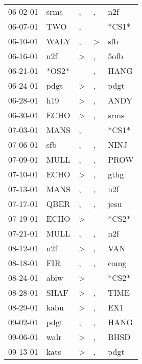 \begin{supertabular}{lllll}
 06-02-01 &   srms &                , &                , &    n2f \\
 06-07-01 &    TWO &                , &                  &  *CS1* \\
 06-10-01 &   WALY &                , &     \textgreater &    sfb \\
 06-16-01 &    n2f &     \textgreater &                , &   5ofb \\
 06-21-01 &  *OS2* &                  &                , &   HANG \\
 06-24-01 &   pdgt &     \textgreater &                , &   pdgt \\
 06-28-01 &    h19 &     \textgreater &                , &   ANDY \\
 06-30-01 &   ECHO &     \textgreater &                , &   srms \\
 07-03-01 &   MANS &                , &                  &  *CS1* \\
 07-06-01 &    sfb &                , &                , &   NINJ \\
 07-09-01 &   MULL &                , &                , &   PROW \\
 07-10-01 &   ECHO &     \textgreater &                , &   gthg \\
 07-13-01 &   MANS &                , &                , &    n2f \\
 07-17-01 &   QBER &                , &                , &   jesu \\
 07-19-01 &   ECHO &     \textgreater &                  &  *CS2* \\
 07-21-01 &   MULL &                , &                , &    n2f \\
 08-12-01 &    n2f &     \textgreater &                , &    VAN \\
 08-18-01 &    FIR &                , &                , &   comg \\
 08-24-01 &   abiw &     \textgreater &                  &  *CS2* \\
 08-28-01 &   SHAF &     \textgreater &                , &   TIME \\
 08-29-01 &   kabu &     \textgreater &                , &    EX1 \\
 09-02-01 &   pdgt &                , &                , &   HANG \\
 09-06-01 &   walr &     \textgreater &                , &   BHSD \\
 09-13-01 &   kats &     \textgreater &                , &   pdgt \\

\end{supertabular}
